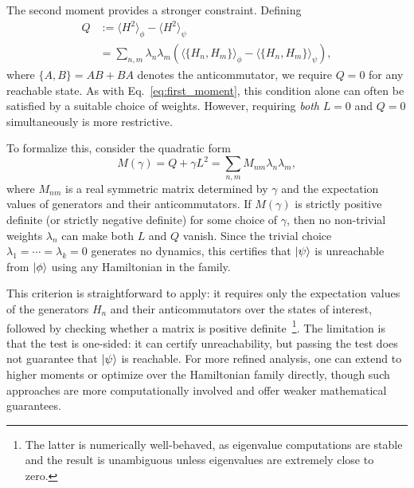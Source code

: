 \documentclass[aps,prx,reprint,superscriptaddress,footnote, twocolumn,notitlepage]{revtex4-2}
\begin{document}
The second moment provides a stronger constraint. Defining
\begin{equation}\begin{aligned}
    Q &:= \langle H^2 \rangle_\phi - \langle H^2 \rangle_\psi \\
    &= \sum_{n,m} \lambda_n \lambda_m \left( \langle \{H_n, H_m\} \rangle_\phi - \langle \{H_n, H_m\} \rangle_\psi \right),
    \end{aligned}
\end{equation}
where $\{A, B\} = AB + BA$ denotes the anticommutator, we require $Q = 0$ for any reachable state. As with Eq.~\eqref{eq:first_moment}, this condition alone can often be satisfied by a suitable choice of weights. However, requiring \emph{both} $L = 0$ and $Q = 0$ simultaneously is more restrictive.

To formalize this, consider the quadratic form
\begin{equation}
    M(\gamma) = Q + \gamma L^2 = \sum_{n,m} M_{nm} \lambda_n \lambda_m,
\end{equation}
where $M_{nm}$ is a real symmetric matrix determined by $\gamma$ and the expectation values of generators and their anticommutators. If $M(\gamma)$ is strictly positive definite (or strictly negative definite) for some choice of $\gamma$, then no non-trivial weights $\lambda_n$ can make both $L$ and $Q$ vanish. Since the trivial choice $\lambda_1 = \cdots = \lambda_k = 0$ generates no dynamics, this certifies that $\ket{\psi}$ is unreachable from $\ket{\phi}$ using any Hamiltonian in the family.

This criterion is straightforward to apply: it requires only the expectation values of the generators $H_n$ and their anticommutators over the states of interest, followed by checking whether a matrix is positive definite~\footnote{The latter is numerically well-behaved, as eigenvalue computations are stable and the result is unambiguous unless eigenvalues are extremely close to zero.}. The limitation is that the test is one-sided: it can certify unreachability, but passing the test does not guarantee that $\ket{\psi}$ is reachable. For more refined analysis, one can extend to higher moments or optimize over the Hamiltonian family directly, though such approaches are more computationally involved and offer weaker mathematical guarantees.
\end{document}
